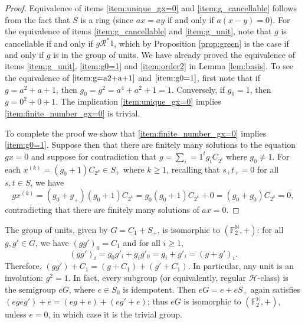 \documentclass[a4paper, 11pt]{article}
\theoremstyle{plain}
\theoremstyle{definition}
\newcommand{\N} {\mathbb{N}}
\newcommand{\F} {\mathbb{F}}
\begin{document}
\begin{proof}
Equivalence of items \ref{item:unique_gx=0} and \ref{item:g_cancellable} follows from the fact that $S$ is a ring (since $ax=ay$ if and only if $a(x-y) = 0$). For the equivalence of items  \ref{item:g_cancellable} and \ref{item:g_unit}, note that $g$ is cancellable if and only if $g \mathcal{R}^* 1$, which by Proposition \ref{prop:green} is the case if and only if $g$ is in the group of units. 
We have already proved the equivalence of items \ref{item:g_unit}, \ref{item:g0=1} and \ref{item:order2} in Lemma \ref{lem:basis}. To see the equivalence of $\ref{item:g=a2+a+1}$ and $\ref{item:g0=1}$, first note that if $g = a^2 + a + 1$, then $g_0 = g^2 = a^4 + a^2 + 1 = 1$. Conversely, if $g_0 = 1$, then $g = 0^2 + 0 + 1$. The implication  \ref{item:unique_gx=0} implies \ref{item:finite_number_gx=0} is trivial.

To complete the proof we show that    \ref{item:finite_number_gx=0} implies \ref{item:g0=1}. Suppose then that there are finitely many solutions to the equation $gx=0$ and suppose for contradiction that $g = \sum_i=1^t g_i C_{2^i}$ where $g_0 \ne 1$. For each $x^{(k)} = (g_0 + 1) C_{ 2^k }\in S_+$ where $k \geq 1$, recalling that $s_+t_+ = 0$ for all $s,t \in S$, we have 
$$g x^{(k)} = (g_0 + g_+)(g_0+1)C_{2^k} = g_0(g_0+1)C_{2^k}  + 0 =    (g_0+g_0)C_{2^k}=0,$$
contradicting that there are finitely many solutions of $ax = 0$.



\end{proof}



The group of units, given by $G = C_1 + S_+$, is isomorphic to $( \F_2^\N, + )$: for all $g, g' \in G$, we have $(gg')_0  = C_1$ and for all $i \ge 1$,
\[
    (gg')_i = g_0 g'_i + g_i g'_0 = g_i + g'_i = (g + g')_i.
\]
Therefore, $(gg') + C_1 = (g + C_1) + (g' + C_1)$. In particular, any unit is an involution: $g^2 = 1$. In fact, every subgroup (or equivalently, regular $\mathcal{H}$-class) is the semigroup $eG$, where $e \in S_0$ is idempotent. Then $eG = e + eS_+$ again satisfies $(eg eg') + e = (eg + e) + (eg' + e)$; thus $eG$ is isomorphic to $( \F_2^\N, + )$, unless $e = 0$, in which case it is the trivial group.
\end{document}
